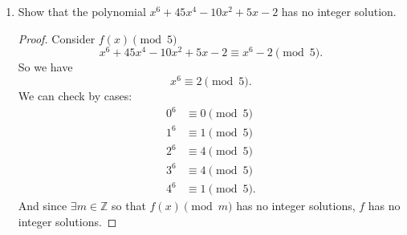 \documentclass{article}
\begin{document}
\begin{enumerate}
    \begin{proof} 
        Argue by induction. 
        Let $p$ be prime and suppose $(a+b)^{p}\equiv a^{p}+b^{p}\pmod{p}$.

        Base case: $a\equiv 0\pmod{p}$: $a^{p}w\equiv 0^{p}\equiv 0\equiv a\pmod{p}$.

        So the base case holds.

        Inductive Hypothesis: 
        Let $k\in\mathbb{Z}_{p}$ and suppose $k^{p}\equiv k\pmod{p}$. We must show that 
        $(k+1)^{p}\equiv k+1\pmod{p}$.

        $(k+1)^{p}\equiv k^{p}+1^{p}\equiv k+1\pmod{p}$.

        So for a prime $p$ and any integer $a$, $a^{p}\equiv a\pmod{p}$.
    \end{proof}
\item Show that the polynomial $x^{6}+45x^{4}-10x^2+5x-2$ has no integer solution.

    \begin{proof} 
        Consider $f(x)\pmod{5}$ 
        \[
        x^{6}+45x^{4}-10x^2+5x-2\equiv x^{6}-2\pmod{5}
        .\] 
        So we have
        \[
        x^{6}\equiv 2\pmod{5}
        .\] 
        We can check by cases:
        \begin{align*}
            0^{6}&\equiv 0\pmod{5}\\
            1^{6}&\equiv 1\pmod{5}\\
            2^{6}&\equiv 4\pmod{5}\\
            3^{6}&\equiv 4\pmod{5}\\
            4^{6}&\equiv 1\pmod{5}
        .\end{align*}
        And since $\exists m\in \mathbb{Z}$ so that $f(x)\pmod{m}$ has no integer solutions, 
        $f$ has no integer solutions.
    \end{proof}

\end{enumerate}
\end{document}

